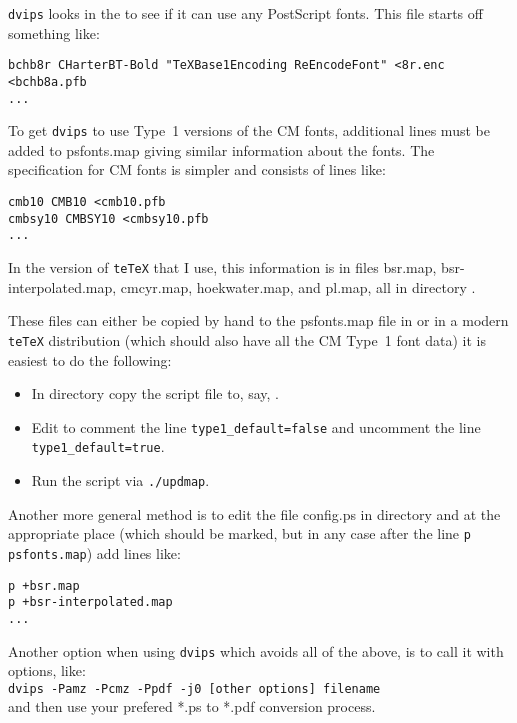 \documentclass[11pt]{article}
\newcommand{\file}[1]{\textsf{#1}}
\newcommand{\program}[1]{\texttt{#1}}
\begin{document}
    \program{dvips} looks in the 
to see if it can use any PostScript fonts. This file starts off something
like:
\begin{verbatim}
bchb8r CHarterBT-Bold "TeXBase1Encoding ReEncodeFont" <8r.enc <bchb8a.pfb
...
\end{verbatim}
To get \program{dvips} to use Type~1 versions of the CM fonts, additional
lines must be added to \file{psfonts.map} giving similar information about
the fonts. The specification for CM fonts is simpler and consists of
lines like:
\begin{verbatim}
cmb10 CMB10 <cmb10.pfb
cmbsy10 CMBSY10 <cmbsy10.pfb
...
\end{verbatim}
In the version of \program{teTeX} that I use, this information is in
files \file{bsr.map}, \file{bsr-interpolated.map}, \file{cmcyr.map},
\file{hoekwater.map}, and \file{pl.map}, all in directory
. 

    These files can either be copied by hand to the \file{psfonts.map}
file in  or in a modern \program{teTeX}
distribution (which should also have all the CM Type~1 font data) it
is easiest to do the following:
\begin{itemize}
\item In directory  copy the script file 
     to, say, .
\item Edit  to comment the line \texttt{type1\_default=false}
      and uncomment the line \texttt{type1\_default=true}.
\item Run the script via \texttt{./updmap}.
\end{itemize}

    Another more general method is to edit the file \file{config.ps} in
directory  and at the appropriate place (which
should be marked, but in any case after the line \texttt{p psfonts.map}) 
add lines like:
\begin{verbatim}
p +bsr.map
p +bsr-interpolated.map
...
\end{verbatim}

    Another option when using \program{dvips} which avoids all of the above, 
is to call it with options, like: \\
\verb|dvips -Pamz -Pcmz -Ppdf -j0 [other options] filename| \\
and then use your prefered \file{*.ps} to \file{*.pdf} conversion process.
\end{document}
